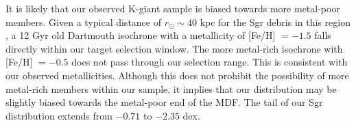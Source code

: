 \documentclass[preprint2]{aastex}
\begin{document}
	It is likely that our observed K-giant sample is biased towards more metal-poor members. Given a typical distance of $r_\odot\sim 40$ kpc for the Sgr debris in this region \citep{Belokurov;et-al_2006}, a 12 Gyr old Dartmouth \citep{Dotter;et-al_2008} isochrone with a metallicity of [Fe/H] $= -1.5$ falls directly within our target selection window. The more metal-rich isochrone with [Fe/H] $= -0.5$ does not pass through our selection range. This is consistent with our observed metallicities. Although this does not prohibit the possibility of more metal-rich members within our sample, it implies that our distribution may be slightly biased towards the metal-poor end of the MDF. The tail of our Sgr distribution extends from $-0.71$ to $-2.35$ dex.

\end{document}
